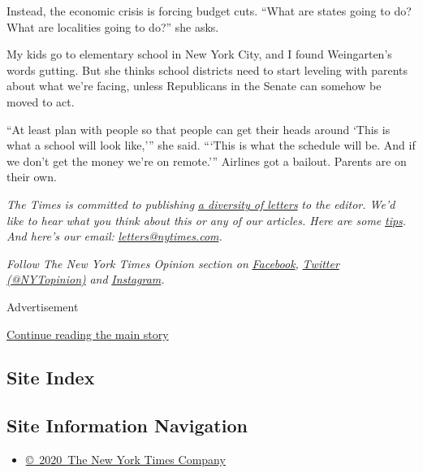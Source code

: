 Instead, the economic crisis is forcing budget cuts. ``What are states
going to do? What are localities going to do?'' she asks.

My kids go to elementary school in New York City, and I found
Weingarten's words gutting. But she thinks school districts need to
start leveling with parents about what we're facing, unless Republicans
in the Senate can somehow be moved to act.

``At least plan with people so that people can get their heads around
`This is what a school will look like,''' she said. ```This is what the
schedule will be. And if we don't get the money we're on remote.'''
Airlines got a bailout. Parents are on their own.

\emph{The Times is committed to publishing}
\href{https://www.nytimes.com/2019/01/31/opinion/letters/letters-to-editor-new-york-times-women.html}{\emph{a
diversity of letters}} \emph{to the editor. We'd like to hear what you
think about this or any of our articles. Here are some}
\href{https://help.nytimes.com/hc/en-us/articles/115014925288-How-to-submit-a-letter-to-the-editor}{\emph{tips}}\emph{.
And here's our email:}
\href{mailto:letters@nytimes.com}{\emph{letters@nytimes.com}}\emph{.}

\emph{Follow The New York Times Opinion section on}
\href{https://www.facebook.com/nytopinion}{\emph{Facebook}}\emph{,}
\href{http://twitter.com/NYTOpinion}{\emph{Twitter (@NYTopinion)}}
\emph{and}
\href{https://www.instagram.com/nytopinion/}{\emph{Instagram}}\emph{.}

Advertisement

\protect\hyperlink{after-bottom}{Continue reading the main story}

\hypertarget{site-index}{%
\subsection{Site Index}\label{site-index}}

\hypertarget{site-information-navigation}{%
\subsection{Site Information
Navigation}\label{site-information-navigation}}

\begin{itemize}
\tightlist
\item
  \href{https://help.nytimes.com/hc/en-us/articles/115014792127-Copyright-notice}{©~2020~The
  New York Times Company}
\end{itemize}

